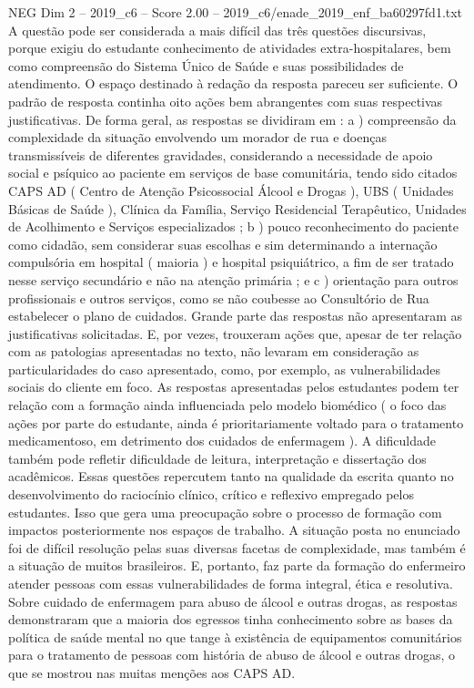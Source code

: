 \begin{textsample}{NEG Dim 2 – 2019\_c6 – Score 2.00 – 2019\_c6/enade\_2019\_enf\_ba60297fd1.txt}
A questão pode ser considerada a mais difícil das três questões discursivas, porque exigiu do estudante conhecimento de atividades extra-hospitalares, bem como compreensão do Sistema Único de Saúde e suas possibilidades de atendimento.
O espaço destinado à redação da resposta pareceu ser suficiente.
O padrão de resposta continha oito ações bem abrangentes com suas respectivas justificativas.
De forma geral, as respostas se dividiram em : a ) compreensão da complexidade da situação envolvendo um morador de rua e doenças transmissíveis de diferentes gravidades, considerando a necessidade de apoio social e psíquico ao paciente em serviços de base comunitária, tendo sido citados CAPS AD ( Centro de Atenção Psicossocial Álcool e Drogas ), UBS ( Unidades Básicas de Saúde ), Clínica da Família, Serviço Residencial Terapêutico, Unidades de Acolhimento e Serviços especializados ; b ) pouco reconhecimento do paciente como cidadão, sem considerar suas escolhas e sim determinando a internação compulsória em hospital ( maioria ) e hospital psiquiátrico, a fim de ser tratado nesse serviço secundário e não na atenção primária ; e c ) orientação para outros profissionais e outros serviços, como se não coubesse ao Consultório de Rua estabelecer o plano de cuidados.
Grande parte das respostas não apresentaram as justificativas solicitadas.
E, por vezes, trouxeram ações que, apesar de ter relação com as patologias apresentadas no texto, não levaram em consideração as particularidades do caso apresentado, como, por exemplo, as vulnerabilidades sociais do cliente em foco.
As respostas apresentadas pelos estudantes podem ter relação com a formação ainda influenciada pelo modelo biomédico ( o foco das ações por parte do estudante, ainda é prioritariamente voltado para o tratamento medicamentoso, em detrimento dos cuidados de enfermagem ).
A dificuldade também pode refletir dificuldade de leitura, interpretação e dissertação dos acadêmicos.
Essas questões repercutem tanto na qualidade da escrita quanto no desenvolvimento do raciocínio clínico, crítico e reflexivo empregado pelos estudantes.
Isso que gera uma preocupação sobre o processo de formação com impactos posteriormente nos espaços de trabalho.
A situação posta no enunciado foi de difícil resolução pelas suas diversas facetas de complexidade, mas também é a situação de muitos brasileiros.
E, portanto, faz parte da formação do enfermeiro atender pessoas com essas vulnerabilidades de forma integral, ética e resolutiva.
Sobre cuidado de enfermagem para abuso de álcool e outras drogas, as respostas demonstraram que a maioria dos egressos tinha conhecimento sobre as bases da política de saúde mental no que tange à existência de equipamentos comunitários para o tratamento de pessoas com história de abuso de álcool e outras drogas, o que se mostrou nas muitas menções aos CAPS AD.

\end{textsample}

